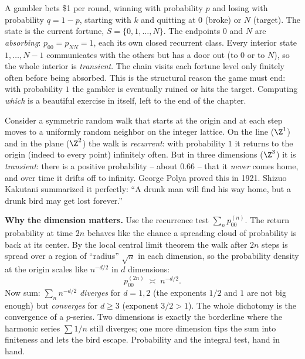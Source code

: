 \begin{example}
\label{ch23:ex-gamblers-ruin}
A gambler bets \$1 per round, winning with probability $p$ and losing with probability
$q = 1-p$, starting with $k$ and quitting at $0$ (broke) or $N$ (target). The state is the
current fortune, $S = \{0, 1, \dots, N\}$. The endpoints $0$ and $N$ are \emph{absorbing}:
$p_{00} = p_{NN} = 1$, each its own closed recurrent class. Every interior state
$1, \dots, N-1$ communicates with the others but has a door out (to $0$ or to $N$), so the
whole interior is \emph{transient}. The chain visits each fortune level only finitely often
before being absorbed. This is the structural reason the game must end: with probability $1$
the gambler is eventually ruined or hits the target. Computing \emph{which} is a beautiful
exercise in itself, left to the end of the chapter.
\end{example}

\begin{paradoxbox}
Consider a symmetric random walk that starts at the origin and at each step moves to a uniformly
random neighbor on the integer lattice. On the line ($\Z^1$) and in the plane ($\Z^2$) the
walk is \emph{recurrent}: with probability $1$ it returns to the origin (indeed to every point)
infinitely often. But in three dimensions ($\Z^3$) it is \emph{transient}: there is a positive
probability -- about $0.66$ -- that it \emph{never} comes home, and over time it drifts off to
infinity. George Polya proved this in 1921. Shizuo Kakutani summarized it perfectly: ``A drunk
man will find his way home, but a drunk bird may get lost forever.''

\textbf{Why the dimension matters.} Use the recurrence test
$\sum_n p_{00}^{(n)}$. The return probability at time $2n$ behaves like the chance a
spreading cloud of probability is back at its center. By the local central limit theorem the
walk after $2n$ steps is spread over a region of ``radius'' $\sqrt{n}$ in each dimension, so the
probability density at the origin scales like $n^{-d/2}$ in $d$ dimensions:
\[
  p_{00}^{(2n)} \;\asymp\; n^{-d/2}.
\]
Now sum: $\sum_n n^{-d/2}$ \emph{diverges} for $d = 1, 2$ (the exponents $1/2$ and $1$ are not
big enough) but \emph{converges} for $d \ge 3$ (exponent $3/2 > 1$). The whole dichotomy is the
convergence of a $p$-series. Two dimensions is exactly the borderline where the harmonic series
$\sum 1/n$ still diverges; one more dimension tips the sum into finiteness and lets the bird
escape. Probability and the integral test, hand in hand.
\end{paradoxbox}

